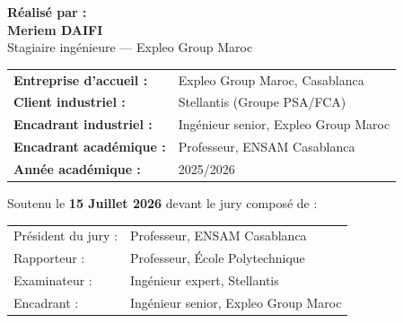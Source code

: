 \documentclass[12pt,a4paper]{report}
\begin{document}
\begin{titlepage}
\begin{center}
\vspace{0.8cm}

{\large\bfseries R\'ealis\'e par :}\\[0.3cm]
{\LARGE\bfseries\color{blue!80!black} Meriem DAIFI}\\[0.2cm]
{\large Stagiaire ing\'enieure --- Expleo Group Maroc}

\vspace{0.8cm}

\begin{tabular}{ll}
\textbf{Entreprise d'accueil :} & Expleo Group Maroc, Casablanca\\[0.2cm]
\textbf{Client industriel :}    & Stellantis (Groupe PSA/FCA)\\[0.2cm]
\textbf{Encadrant industriel :} & Ing\'enieur senior, Expleo Group Maroc\\[0.2cm]
\textbf{Encadrant acad\'emique :} & Professeur, ENSAM Casablanca\\[0.2cm]
\textbf{Ann\'ee acad\'emique :} & 2025/2026\\
\end{tabular}

\vspace{0.8cm}


\vfill

{\large Soutenu le \textbf{15 Juillet 2026} devant le jury compos\'e de :}\\[0.3cm]
\begin{tabular}{ll}
  Pr\'esident du jury : & Professeur, ENSAM Casablanca\\
  Rapporteur :          & Professeur, \'Ecole Polytechnique\\
  Examinateur :         & Ing\'enieur expert, Stellantis\\
  Encadrant :           & Ing\'enieur senior, Expleo Group Maroc\\
\end{tabular}

\end{center}
\end{titlepage}
\end{document}
